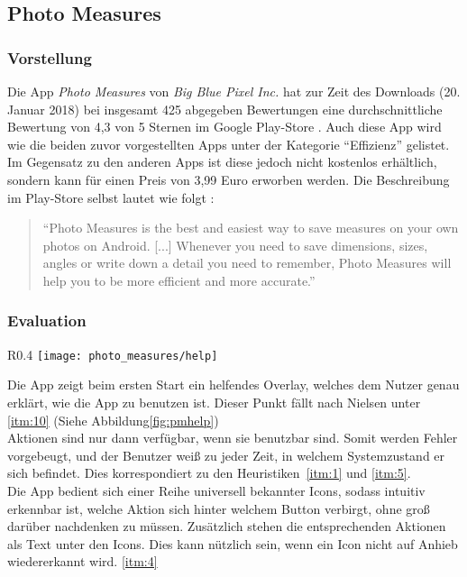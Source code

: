\subsection{Photo Measures}

\subsubsection{Vorstellung}
Die App \emph{Photo Measures} von \emph{Big Blue Pixel Inc.} hat zur Zeit des Downloads (20. Januar 2018) bei insgesamt 425 abgegeben Bewertungen eine durchschnittliche Bewertung von 4,3 von 5 Sternen im Google Play-Store \citep{PixelPM}.
Auch diese App wird wie die beiden zuvor vorgestellten Apps unter der Kategorie ``Effizienz'' gelistet.
Im Gegensatz zu den anderen Apps ist diese jedoch nicht kostenlos erhältlich, sondern kann für einen Preis von 3,99 Euro erworben werden.  
Die Beschreibung im Play-Store selbst lautet wie folgt :

\begin{quote}
  ``Photo Measures is the best and easiest way to save measures on your own photos on Android.
  [...] Whenever you need to save dimensions, sizes, angles or write down a detail you need to remember, Photo Measures will help you to be more efficient and more accurate.''
\end{quote}

\subsubsection{Evaluation}
\begin{wrapfigure}{R}{0.4\textwidth}
	\centering
	\texttt{[image: photo\_measures/help]}
	\caption{Initialer Start}	
	\label{fig:pmhelp}
\end{wrapfigure}

Die App zeigt beim ersten Start ein helfendes Overlay, welches dem Nutzer genau erklärt, wie die App zu benutzen ist. Dieser Punkt fällt nach Nielsen unter \ref{itm:10} (Siehe Abbildung\ref{fig:pmhelp}) \\
 
Aktionen sind nur dann verfügbar, wenn sie benutzbar sind. Somit werden Fehler vorgebeugt, und der Benutzer weiß zu jeder Zeit, in welchem Systemzustand er sich befindet. Dies korrespondiert zu den Heuristiken~\ref{itm:1} und \ref{itm:5}.  \\

Die App bedient sich einer Reihe universell bekannter Icons, sodass intuitiv erkennbar ist, welche Aktion sich hinter welchem Button verbirgt, ohne groß darüber nachdenken zu müssen. Zusätzlich stehen die entsprechenden Aktionen als Text unter den Icons. Dies kann nützlich sein, wenn ein Icon nicht auf Anhieb wiedererkannt wird. \ref{itm:4}  \\


